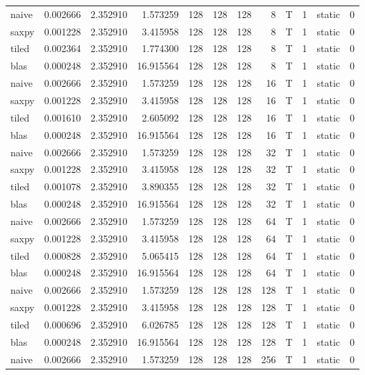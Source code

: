\documentclass[
  12pt,
  xcolor = usenames,dvipsnames]{article}
\begin{document}
\begin{table}[!h]
{\begin{tabular}[t]{lrrrrrrrlrlr}
naive & 0.002666 & 2.352910 & 1.573259 & 128 & 128 & 128 & 8 & T & 1 & static & 0\\
saxpy & 0.001228 & 2.352910 & 3.415958 & 128 & 128 & 128 & 8 & T & 1 & static & 0\\
tiled & 0.002364 & 2.352910 & 1.774300 & 128 & 128 & 128 & 8 & T & 1 & static & 0\\
blas & 0.000248 & 2.352910 & 16.915564 & 128 & 128 & 128 & 8 & T & 1 & static & 0\\
\addlinespace
naive & 0.002666 & 2.352910 & 1.573259 & 128 & 128 & 128 & 16 & T & 1 & static & 0\\
saxpy & 0.001228 & 2.352910 & 3.415958 & 128 & 128 & 128 & 16 & T & 1 & static & 0\\
tiled & 0.001610 & 2.352910 & 2.605092 & 128 & 128 & 128 & 16 & T & 1 & static & 0\\
blas & 0.000248 & 2.352910 & 16.915564 & 128 & 128 & 128 & 16 & T & 1 & static & 0\\
naive & 0.002666 & 2.352910 & 1.573259 & 128 & 128 & 128 & 32 & T & 1 & static & 0\\
\addlinespace
saxpy & 0.001228 & 2.352910 & 3.415958 & 128 & 128 & 128 & 32 & T & 1 & static & 0\\
tiled & 0.001078 & 2.352910 & 3.890355 & 128 & 128 & 128 & 32 & T & 1 & static & 0\\
blas & 0.000248 & 2.352910 & 16.915564 & 128 & 128 & 128 & 32 & T & 1 & static & 0\\
naive & 0.002666 & 2.352910 & 1.573259 & 128 & 128 & 128 & 64 & T & 1 & static & 0\\
saxpy & 0.001228 & 2.352910 & 3.415958 & 128 & 128 & 128 & 64 & T & 1 & static & 0\\
\addlinespace
tiled & 0.000828 & 2.352910 & 5.065415 & 128 & 128 & 128 & 64 & T & 1 & static & 0\\
blas & 0.000248 & 2.352910 & 16.915564 & 128 & 128 & 128 & 64 & T & 1 & static & 0\\
naive & 0.002666 & 2.352910 & 1.573259 & 128 & 128 & 128 & 128 & T & 1 & static & 0\\
saxpy & 0.001228 & 2.352910 & 3.415958 & 128 & 128 & 128 & 128 & T & 1 & static & 0\\
tiled & 0.000696 & 2.352910 & 6.026785 & 128 & 128 & 128 & 128 & T & 1 & static & 0\\
\addlinespace
blas & 0.000248 & 2.352910 & 16.915564 & 128 & 128 & 128 & 128 & T & 1 & static & 0\\
naive & 0.002666 & 2.352910 & 1.573259 & 128 & 128 & 128 & 256 & T & 1 & static & 0\\

\end{tabular}}
\end{table}
\end{document}
